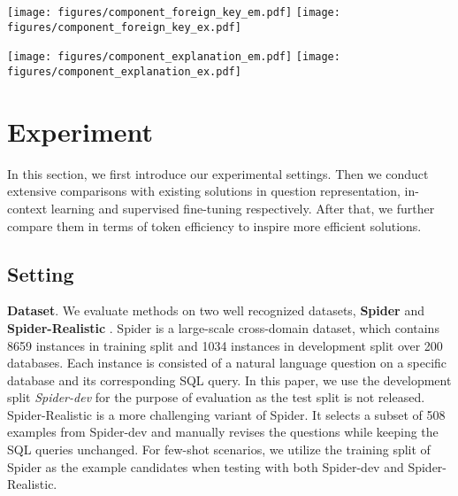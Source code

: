 \begin{figure*}[t]
    \centering

    \texttt{[image: figures/component\_foreign\_key\_em.pdf]}
    \texttt{[image: figures/component\_foreign\_key\_ex.pdf]}
    \caption{}
	\label{fig:openai_zero_shot_key}
\end{figure*}

\begin{figure*}[t]
    \centering

    \texttt{[image: figures/component\_explanation\_em.pdf]}
    \texttt{[image: figures/component\_explanation\_ex.pdf]}
    \caption{}
	\label{fig:openai_zero_shot_rule}
\end{figure*}

\section{Experiment}
\label{sec:exp}
In this section, we first introduce our experimental settings. 
Then we conduct extensive comparisons with existing solutions in question representation, in-context learning and supervised fine-tuning respectively. 
After that, we further compare them in terms of token efficiency to inspire more efficient solutions.

\subsection{Setting}

\textbf{Dataset}. 
We evaluate \nlsql methods on two well recognized datasets, \textbf{Spider} \cite{spider} and \textbf{Spider-Realistic} \cite{realistic}. 
Spider is a large-scale cross-domain \nlsql dataset, which contains 8659 instances in training split and 1034 instances in development split over 200 databases. 
Each instance is consisted of a natural language question on a specific database and its corresponding SQL query. 
In this paper, we use the development split \emph{Spider-dev} for the purpose of evaluation as the test split is not released.
Spider-Realistic \cite{realistic} is a more challenging variant of Spider. 
It selects a subset of 508 examples from Spider-dev and manually revises the questions while keeping the SQL queries unchanged. 
For few-shot scenarios, we utilize the training split of Spider as the example candidates when testing with both Spider-dev and Spider-Realistic.

